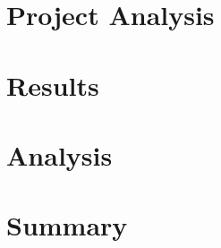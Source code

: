 \chapter{Project Analysis}\label{chapter:projectAnalysis}


\chapter{Results}\label{chapter:results}


\chapter{Analysis}\label{chapter:analysis}


\chapter{Summary}\label{chapter:summary} 


